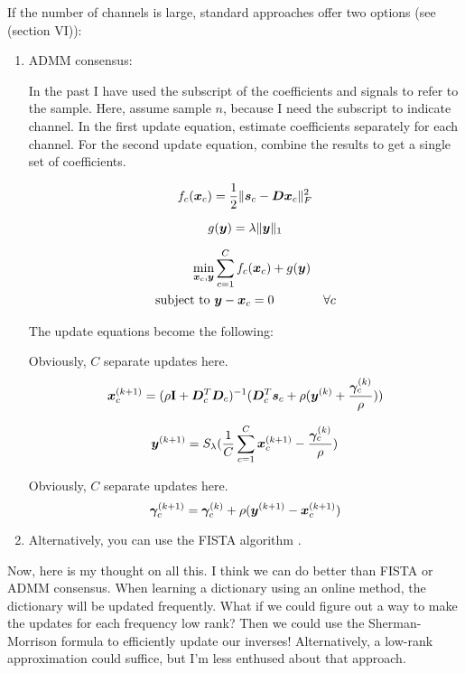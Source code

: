 \documentclass{article}
\begin{document}
If the number of channels is large, standard approaches offer two options (see \cite{garcia2018convolutional} (section VI)):
\begin{enumerate}
\item ADMM consensus:

In the past I have used the subscript of the coefficients and signals to refer to the sample.  Here, assume sample $n$, because I need the subscript to indicate channel. In the first update equation, estimate coefficients separately for each channel. For the second update equation, combine the results to get a single set of coefficients.

\begin{equation}
f_c(\bm{x}_c) = \frac{1}{2}\|\bm{s}_c - \bm{D}\bm{x}_c\|_F^2
\end{equation}

\begin{equation}
g(\bm{y}) = \lambda\|\bm{y}\|_1
\end{equation}


\begin{equation}
\begin{aligned}
\min_{\bm{x}_c,\bm{y}} & \sum_{c = 1}^C f_c(\bm{x}_c) + g(\bm{y})\\
\text{subject to } & \bm{y} - \bm{x}_c = 0 & \forall c
\end{aligned}
\end{equation}

The update equations become the following:

Obviously, $C$ separate updates here.
\begin{equation}
\bm{x}_c^{(k + 1)} = (\rho{\bf I} + \bm{D}_c^T\bm{D}_c)^{-1}(\bm{D}_c^T\bm{s}_c + \rho(\bm{y}^{(k)}  + \frac{\bm{\gamma}_c^{(k)}}{\rho}))
\end{equation}

\begin{equation}
\bm{y}^{(k + 1)} = S_{\lambda}( \frac{1}{C}\sum_{c = 1}^C \bm{x}_c^{(k + 1)} - \frac{\bm{\gamma}_c^{(k)}}{\rho})
\end{equation}

Obviously, $C$ separate updates here.
\begin{equation}
\bm{\gamma}_c^{(k + 1)} = \bm{\gamma}_c^{(k)} + \rho(\bm{y}^{(k + 1)} - \bm{x}_c^{(k + 1)})
\end{equation}

\item
Alternatively, you can use the FISTA algorithm \cite{beck2009fast}.
\end{enumerate}

Now, here is my thought on all this. I think we can do better than FISTA or ADMM consensus.  When learning a dictionary using an online method, the dictionary will be updated frequently. What if we could figure out a way to make the updates for each frequency low rank? Then we could use the Sherman-Morrison formula to efficiently update our inverses! Alternatively, a low-rank approximation could suffice, but I'm less enthused about that approach.
\end{document}
